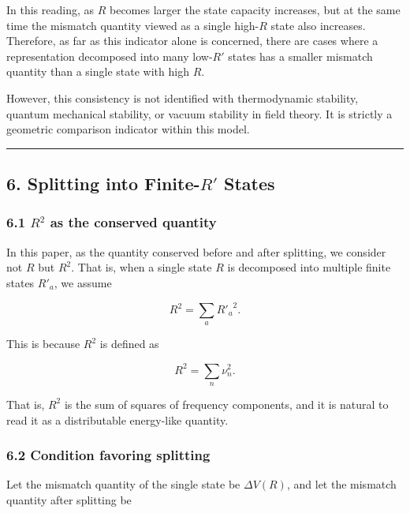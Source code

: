 \documentclass[
]{article}
\begin{document}
In this reading, as \(R\) becomes larger the state capacity increases,
but at the same time the mismatch quantity viewed as a single high-\(R\)
state also increases. Therefore, as far as this indicator alone is
concerned, there are cases where a representation decomposed into many
low-\(R'\) states has a smaller mismatch quantity than a single state
with high \(R\).

However, this consistency is not identified with thermodynamic
stability, quantum mechanical stability, or vacuum stability in field
theory. It is strictly a geometric comparison indicator within this
model.

\begin{center}\rule{0.5\linewidth}{0.5pt}\end{center}

\subsection{\texorpdfstring{6. Splitting into Finite-\(R'\)
States}{6. Splitting into Finite-R\textquotesingle{} States}}\label{splitting-into-finite-r-states}

\subsubsection{\texorpdfstring{6.1 \(R^2\) as the conserved
quantity}{6.1 R\^{}2 as the conserved quantity}}\label{r2-as-the-conserved-quantity}

In this paper, as the quantity conserved before and after splitting, we
consider not \(R\) but \(R^2\). That is, when a single state \(R\) is
decomposed into multiple finite states \(R'_a\), we assume

\[
R^2=\sum_a {R'_a}^2.
\]

This is because \(R^2\) is defined as

\[
R^2=\sum_n\nu_n^2.
\]

That is, \(R^2\) is the sum of squares of frequency components, and it
is natural to read it as a distributable energy-like quantity.

\subsubsection{6.2 Condition favoring
splitting}\label{condition-favoring-splitting}

Let the mismatch quantity of the single state be \(\Delta V(R)\), and
let the mismatch quantity after splitting be
\end{document}
